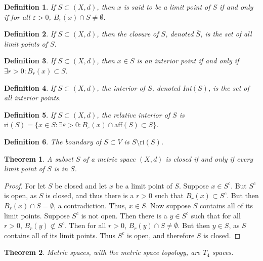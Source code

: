 \documentclass[crop=false,class=book]{standalone}
\theoremstyle{mystyle}
\newtheorem{theorem}{Theorem}[section]
\newtheorem{definition}{Definition}[section]
\begin{document}
\begin{definition}
If $S\subset (X,d)$, then $x$ is said to be a limit point of $S$ if and only if for all $\varepsilon>0$, $B_{\varepsilon}(x)\cap S \ne \emptyset$.
\end{definition}
\begin{definition}
If $S\subset (X,d)$, then the closure of $S$, denoted $\overline{S}$, is the set of all limit points of $S$.
\end{definition}
\begin{definition}
If $S\subset (X,d)$, then $x\in S$ is an interior point if and only if $\exists r>0:B_{r}(x)\subset S$.
\end{definition}
\begin{definition}
If $S\subset (X,d)$, the interior of $S$, denoted Int$(S)$, is the set of all interior points.
\end{definition}
\begin{definition}
If $S\subset (X,d)$, the relative interior of $S$ is $\textrm{ri}(S)= \{x\in S:\exists \varepsilon>0:B_{\varepsilon}(x)\cap \textrm{aff}(S)\subset S\}$.
\end{definition}
\begin{definition}
The boundary of $S\subset V$ is $S\setminus \textrm{ri}(S)$.
\end{definition}
\begin{theorem}
A subset $S$ of a metric space $(X,d)$ is closed if and only if every limit point of $S$ is in $S$.
\end{theorem}
\begin{proof}
For let $S$ be closed and let $x$ be a limit point of $S$. Suppose $x\in S^c$. But $S^c$ is open, as $S$ is closed, and thus there is a $r>0$ such that $B_{r}(x)\subset S^c$. But then $B_{r}(x)\cap S = \emptyset$, a contradiction. Thus, $x\in S$. Now suppose $S$ contains all of its limit points. Suppose $S^c$ is not open. Then there is a $y\in S^c$ such that for all $r>0$, $B_{r}(y)\not \subset S^c$. Then for all $r>0$, $B_{r}(y)\cap S \ne \emptyset$. But then $y\in S$, as $S$ contains all of its limit points. Thus $S^c$ is open, and therefore $S$ is closed.
\end{proof}
\begin{theorem}
Metric spaces, with the metric space topology, are $T_4$ spaces.
\end{theorem}
\end{document}

